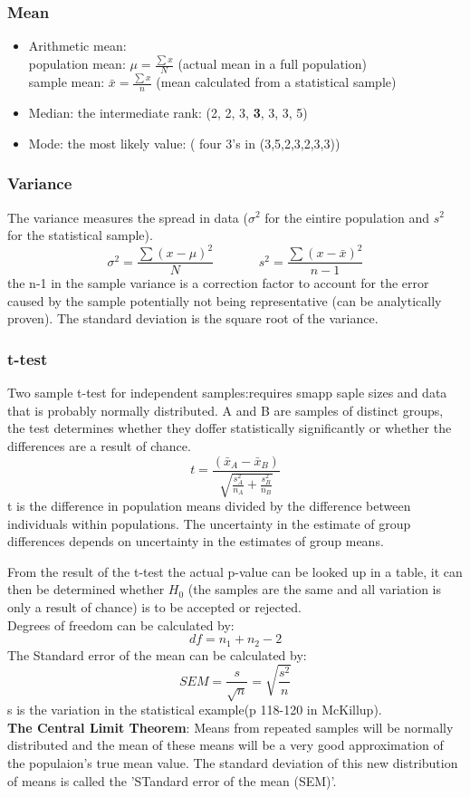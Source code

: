 \documentclass{article}
\begin{document}
\subsubsection{Mean}
\begin{itemize}
    \item Arithmetic mean: \\
    population mean: $\mu = \frac{\sum x}{N}$ (actual mean in a full population)\\
    sample mean: $\bar{x} = \frac{\sum x}{n}$ (mean calculated from a statistical sample)
    \item Median: the intermediate rank: (2, 2, 3, \textbf{3}, 3, 3, 5)
    \item Mode: the most likely value: ( four 3's in (3,5,2,3,2,3,3))
\end{itemize}

\subsubsection{Variance}
The variance measures the spread in data ($\sigma ^2$ for the eintire population and $s^2$ for the statistical sample).
$$\sigma^2 = \frac{\sum(x-\mu)^2}{N} \: \: \: \: \: \: \;\;\;\;\;\;\;\; s^2 = \frac{\sum(x - \bar{x})^2}{n-1} $$
the n-1 in the sample variance is a correction factor to account for the error caused by the sample potentially not being representative (can be analytically proven). The standard deviation is the square root of the variance.

\subsubsection{t-test} \label{ttest}
Two sample t-test for independent samples:requires smapp saple sizes and data that is probably normally distributed. A and B are samples of distinct groups, the test determines whether they doffer statistically significantly or whether the differences are a result of chance.
$$t = \frac{(\bar{x}_{A} - \bar{x}_{B})}{\sqrt{\frac{s_{A}^2}{n_{A}} + \frac{s_{B}^2}{n_{B}}}}$$
t is the difference in population means divided by the difference between individuals within populations. The uncertainty in the estimate of group differences depends on uncertainty in the estimates of group means.\par 
From the result of the t-test the actual p-value can be looked up in a table, it can then be determined whether $H_0$ (the samples are the same and all variation is only a result of chance) is to be accepted or rejected.\\
Degrees of freedom can be calculated by: $$df = n_1 + n_2 -2$$ 
The Standard error of the mean can be calculated by: $$SEM= \frac{s}{\sqrt{n}}= \sqrt{\frac{s^2}{n}}$$
s is the variation in the statistical example(p 118-120 in McKillup).\\
\textbf{The Central Limit Theorem}: Means from repeated samples will be normally distributed and the mean of these means will be a very good approximation of the populaion's true mean value. The standard deviation of this new distribution of means is called the 'STandard error of the mean (SEM)'.\par 
\end{document}
